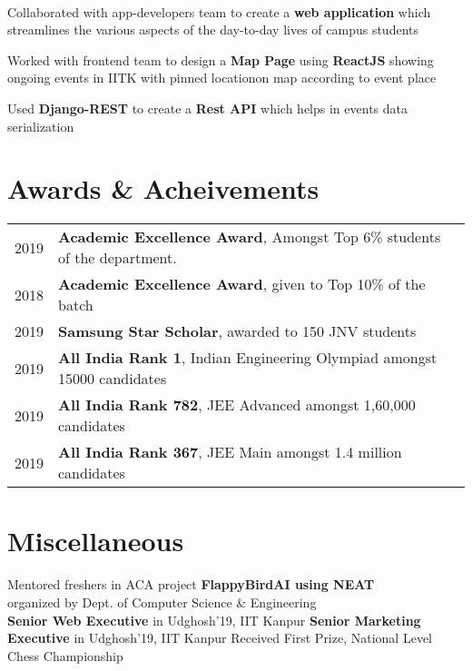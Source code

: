 \documentclass[]{deedy-resume-openfont}
\begin{document}
\begin{minipage}[t]{0.66\textwidth}
\\
\begin{tightemize}
	\item Collaborated with app-developers team to create a \textbf{web application} which streamlines the various aspects of the day-to-day lives of campus students
	\item Worked with frontend team to design a \textbf{Map Page} using \textbf{ReactJS} showing ongoing events in IITK with pinned locationon map according to event place
	\item Used \textbf{Django-REST} to create  a \textbf{Rest API} which helps in events data serialization
\end{tightemize}

\section{Awards \& Acheivements} 
\begin{tabular}{rll}
2019	  & \textbf{Academic Excellence Award}, Amongst Top 6\% students of the department.\\
2018	    &\textbf{Academic Excellence Award}, given to Top 10\% of the batch\\
2019	      & \textbf{Samsung Star Scholar}, awarded to 150 JNV students\\
2019	      & \textbf{All India Rank 1}, Indian Engineering Olympiad amongst 15000 candidates\\
2019	      & \textbf{All India Rank 782}, JEE Advanced amongst 1,60,000 candidates\\
2019	      & \textbf{All India Rank 367}, JEE Main
amongst 1.4 million candidates
\end{tabular}

\section{Miscellaneous} 

\textbullet{} Mentored freshers in ACA project \textbf{{ FlappyBirdAI using NEAT}} \\
\hspace{2mm} organized by Dept. of Computer Science \& Engineering\\
\textbullet{} \textbf{ Senior Web Executive} in Udghosh'19, IIT Kanpur
\newline
\textbullet{} \textbf{ Senior Marketing Executive} in Udghosh'19, IIT Kanpur
\newline
\textbullet{} Received First Prize, National Level Chess Championship  

\end{minipage} 
\end{document}

